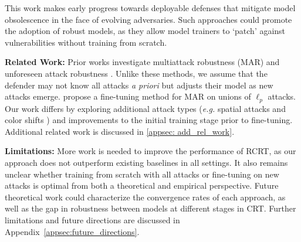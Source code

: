 This work makes early progress towards deployable defenses that mitigate model obsolescence in the face of evolving adversaries. Such approaches could promote the adoption of robust models, as they allow model trainers to `patch' against vulnerabilities without training from scratch. 





\noindent\textbf{Related Work:} Prior works investigate multiattack robustness (MAR) \citep{MainiWK20,TB19,madaan2020learning,Croce020} and unforeseen attack robustness \citep{laidlaw2020perceptual,zhang2018lpips,dai2022formulating,jin2020manifold,dai2023multirobustbench}. Unlike these methods, we assume that the defender may not know all attacks \emph{a priori} but adjusts their model as new attacks emerge. \citet{croce2022adversarial} propose a fine-tuning method for MAR on unions of $\ell_p$ attacks. Our work differs by exploring additional attack types (\emph{e.g.} spatial attacks \citep{XiaoZ0HLS18} and color shifts \citep{LaidlawF19}) and improvements to the initial training stage prior to fine-tuning. Additional related work is discussed in \cref{appsec: add_rel_work}.

\noindent\textbf{Limitations:} 
More work is needed to improve the performance of RCRT, as our approach does not outperform existing baselines in all settings. It also remains unclear whether training from scratch with all attacks or fine-tuning on new attacks is optimal from both a theoretical and empirical perspective. Future theoretical work could characterize the convergence rates of each approach, as well as the gap in robustness between models at different stages in CRT. Further limitations and future directions are discussed in Appendix~\ref{appsec:future_directions}.

